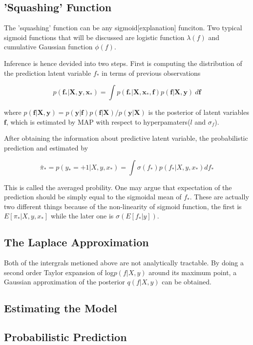 \documentclass[11pt]{report}
\begin{document}
\subsection{'Squashing' Function}
The 'squashing' function can be any sigmoid[explanation] funciton. Two typical sigmoid functions that will be discussed are logistic function $\lambda (f)$ and cumulative Gaussian function $\phi (f)$.


Inference is hence devided into two steps. First is computing the distribution of the prediction latent variable $f_*$ in terms of previous observations 

\[p(\boldsymbol f_*|\boldsymbol X,\boldsymbol y,\boldsymbol x_*) = \int p(\boldsymbol f_*|\boldsymbol X,\boldsymbol x_*,\boldsymbol f)p(\boldsymbol f|\boldsymbol X,\boldsymbol y)\ d\boldsymbol f\]

where \(p(\boldsymbol f|\boldsymbol X,\boldsymbol y) = {p(\boldsymbol y|\boldsymbol f)p(\boldsymbol f|\boldsymbol X)}/{p(\boldsymbol y|\boldsymbol X)}\) is the posterior of latent variables $\boldsymbol f$, which is estimated by MAP with respect to hyperpamaters($l$ and $\sigma_f$).

After obtaining the information about predictive latent variable, the probabilistic prediction and estimated by

\[\bar{\pi}_* = p(y_* = +1|X,y,x_*) = \int \sigma (f_*)p(f_*|X,y,x_*) df_*\] 

This is called the averaged probility. One may argue that expectation of the prediction should be simply equal to the sigmoidal mean of $f_*$. These are actually two different things because of the non-linearity of sigmoid function, the first is $E[\pi_*|X,y,x_*]$ while the later one is $\sigma (E[f_*|y])$.

\subsection{The Laplace Approximation}

Both of the intergrals metioned above are not analytically tractable. By doing a second order Taylor expansion of log$p(f|X,y)$ around its maximum point, a Gaussian approximation of the posterior $q(f|X,y)$ can be obtained.

\subsection{Estimating the Model}


\subsection{Probabilistic Prediction}
\end{document}

